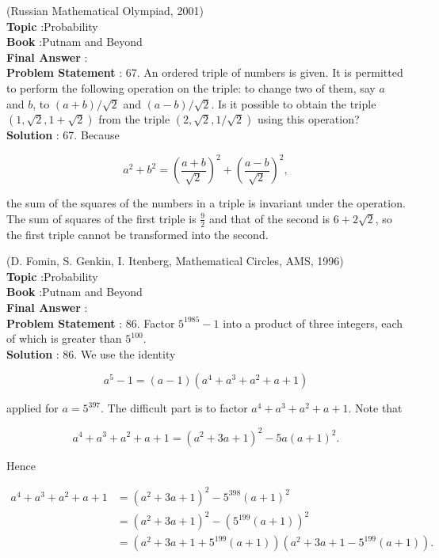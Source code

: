 \documentclass[10pt]{article}
\begin{document}
(Russian Mathematical Olympiad, 2001)
\\
\textbf{Topic} :Probability\\
\textbf{Book} :Putnam and Beyond\\
\textbf{Final Answer} :\\


\textbf{Problem Statement} :
67. An ordered triple of numbers is given. It is permitted to perform the following operation on the triple: to change two of them, say $a$ and $b$, to $(a+b) / \sqrt{2}$ and $(a-b) / \sqrt{2}$. Is it possible to obtain the triple $(1, \sqrt{2}, 1+\sqrt{2})$ from the triple $(2, \sqrt{2}, 1 / \sqrt{2})$ using this operation?
\\
\textbf{Solution} :
67. Because

$$
a^{2}+b^{2}=\left(\frac{a+b}{\sqrt{2}}\right)^{2}+\left(\frac{a-b}{\sqrt{2}}\right)^{2},
$$

the sum of the squares of the numbers in a triple is invariant under the operation. The sum of squares of the first triple is $\frac{9}{2}$ and that of the second is $6+2 \sqrt{2}$, so the first triple cannot be transformed into the second.

(D. Fomin, S. Genkin, I. Itenberg, Mathematical Circles, AMS, 1996)
\\
\textbf{Topic} :Probability\\
\textbf{Book} :Putnam and Beyond\\
\textbf{Final Answer} :\\


\textbf{Problem Statement} :
86. Factor $5^{1985}-1$ into a product of three integers, each of which is greater than $5^{100}$.
\\
\textbf{Solution} :
86. We use the identity

$$
a^{5}-1=(a-1)\left(a^{4}+a^{3}+a^{2}+a+1\right)
$$

applied for $a=5^{397}$. The difficult part is to factor $a^{4}+a^{3}+a^{2}+a+1$. Note that

$$
a^{4}+a^{3}+a^{2}+a+1=\left(a^{2}+3 a+1\right)^{2}-5 a(a+1)^{2} .
$$

Hence

$$
\begin{aligned}
a^{4}+a^{3}+a^{2}+a+1 &=\left(a^{2}+3 a+1\right)^{2}-5^{398}(a+1)^{2} \\
&=\left(a^{2}+3 a+1\right)^{2}-\left(5^{199}(a+1)\right)^{2} \\
&=\left(a^{2}+3 a+1+5^{199}(a+1)\right)\left(a^{2}+3 a+1-5^{199}(a+1)\right) .
\end{aligned}
$$
\end{document}
